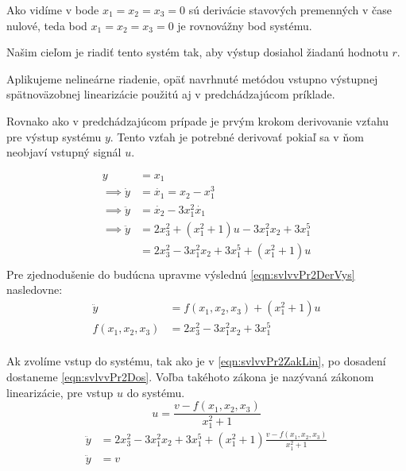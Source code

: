 \documentclass[../main.tex]{subfiles}
\begin{document}
		Ako vidíme v bode $x_1 = x_2 = x_3 = 0 $ sú derivácie stavových premenných v čase nulové, teda bod $x_1 = x_2 = x_3 = 0 $ je rovnovážny bod systému.
	
	Našim cieľom je riadiť tento systém tak, aby výstup dosiahol žiadanú hodnotu $r$.
	
	Aplikujeme nelineárne riadenie, opäť navrhnuté metódou vstupno výstupnej spätnoväzobnej linearizácie použitú aj v predchádzajúcom príklade. 
	
	Rovnako ako v predchádzajúcom prípade je prvým krokom derivovanie vzťahu pre výstup systému $y$. Tento vzťah je potrebné derivovať pokiaľ sa v ňom neobjaví vstupný signál $u$. 

 	\begin{equation}
	\begin{aligned}
	y &= x_1 \\ 
	\implies \dot{y}  &= \dot{x_1} =  x_2 - x_1^3 \\
	\implies \ddot{y} &= \dot{x_2} - 3x_1^2\dot{x_1} \\
	\implies \ddot{y} &= 2x_3^2 + (x_1^2 + 1)u - 3x_1^2x_2 + 3x_1^5 \\
	&= 2x_3^2 - 3x_1^2x_2 + 3x_1^5 + (x_1^2 + 1)u\\
	\end{aligned}
	\label{eqn:svlvvPr2DerVys}
	\end{equation}
	Pre zjednodušenie do budúcna upravme výslednú \cref{eqn:svlvvPr2DerVys} nasledovne:
	 \begin{equation}
	\begin{aligned}
	\ddot{y} &= f(x_1,x_2,x_3) + (x_1^2 + 1)u \\
	f(x_1,x_2,x_3) &= 2x_3^2 - 3x_1^2x_2 + 3x_1^5\\
	\end{aligned}
	\label{eqn:svlvvPr2DerUp}
	\end{equation}
	
	Ak zvolíme vstup do systému, tak ako je v \cref{eqn:svlvvPr2ZakLin}, po dosadení dostaneme \cref{eqn:svlvvPr2Dos}. Voľba takéhoto zákona je nazývaná zákonom linearizácie, pre vstup $u$ do systému.
	\begin{equation}
	u = \frac{v - f(x_1,x_2,x_3)}{x_1^2 + 1}
	\label{eqn:svlvvPr2ZakLin}
	\end{equation}
	\begin{equation}
	\begin{aligned}
	\ddot{y} &= 2x_3^2 - 3x_1^2x_2 + 3x_1^5 + (x_1^2 + 1)\frac{v - f(x_1,x_2,x_3)}{x_1^2 + 1} \\
	\ddot{y} &=v  \\ 
	\end{aligned}
	\label{eqn:svlvvPr2Dos}
	\end{equation}
	
\end{document}
